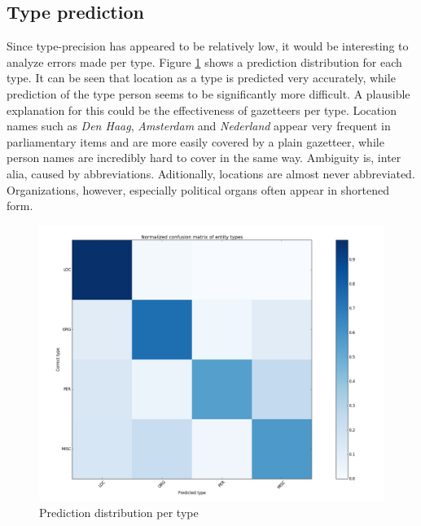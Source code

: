 \subsection{Type prediction}\label{subsec:type_pred}
Since type-precision has appeared to be relatively low, it would be interesting to analyze errors made per type. Figure \ref{fig:confusion} shows a prediction distribution for each type. 
It can be seen that location as a type is predicted very accurately, while prediction of the type person seems to be significantly more difficult. A plausible explanation for this could be the effectiveness of gazetteers per type. Location names such as \textit{Den Haag}, \textit{Amsterdam} and \textit{Nederland} appear very frequent in parliamentary items and are more easily covered by a plain gazetteer, while person names are incredibly hard to cover in the same way. Ambiguity is, inter alia, caused by abbreviations. Aditionally, locations are almost never abbreviated. Organizations, however, especially political organs often appear in shortened form. 

\begin{figure}
    \centering
    \includegraphics[scale=0.4]{fig/confusion_matrix_reclassified}
    \caption{Prediction distribution per type}
    \label{fig:confusion}
\end{figure}
